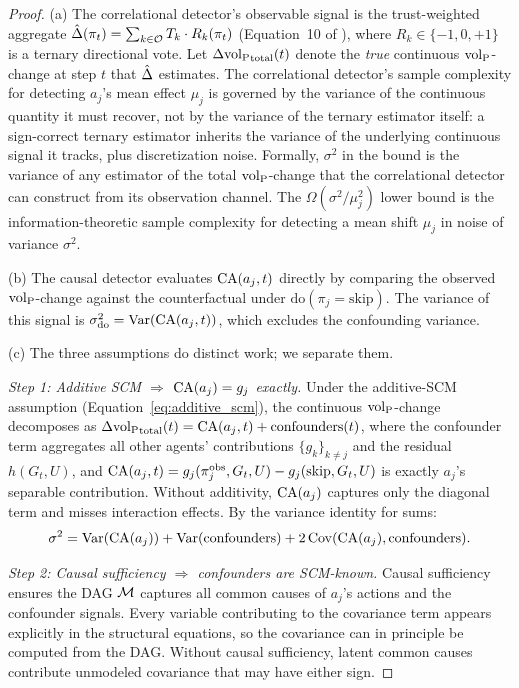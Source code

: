 \begin{proof}
(a) The correlational detector's observable signal is the
trust-weighted aggregate
$\hat{\Delta}(\pi_t) = \sum_{k \in \mathcal{O}} T_k \cdot R_k(\pi_t)$
(Equation~10 of \citet{lasser2026gfm}), where $R_k \in \{-1, 0, +1\}$
is a ternary directional vote. Let
$\Delta {\operatorname{vol}_{\mathrm{P}}}_{\mathrm{total}}(t)$ denote the \emph{true} continuous
${\operatorname{vol}_{\mathrm{P}}}$-change at step $t$ that $\hat{\Delta}$ estimates. The
correlational detector's sample complexity for detecting $a_j$'s
mean effect $\mu_j$ is governed by the variance of the continuous
quantity it must recover, not by the variance of the ternary
estimator itself: a sign-correct ternary estimator inherits the
variance of the underlying continuous signal it tracks, plus
discretization noise. Formally, $\sigma^2$ in the bound is the
variance of any estimator of the total ${\operatorname{vol}_{\mathrm{P}}}$-change that the
correlational detector can construct from its observation channel.
The $\Omega(\sigma^2 / \mu_j^2)$ lower bound is the
information-theoretic sample complexity for detecting a mean shift
$\mu_j$ in noise of variance $\sigma^2$.

(b) The causal detector evaluates $\mathrm{CA}(a_j, t)$ directly by
comparing the observed ${\operatorname{vol}_{\mathrm{P}}}$-change against the counterfactual under
$\mathrm{do}(\pi_j = \mathrm{skip})$. The variance of this signal is
$\sigma_{\mathrm{do}}^2 = \mathrm{Var}(\mathrm{CA}(a_j, t))$, which
excludes the confounding variance.

(c) The three assumptions do distinct work; we separate them.

\emph{Step 1: Additive SCM $\Rightarrow$ $\mathrm{CA}(a_j) = g_j$
exactly.} Under the additive-SCM assumption
(Equation~\eqref{eq:additive_scm}), the continuous ${\operatorname{vol}_{\mathrm{P}}}$-change
decomposes as
$\Delta {\operatorname{vol}_{\mathrm{P}}}_{\mathrm{total}}(t) = \mathrm{CA}(a_j, t) +
    \mathrm{confounders}(t)$,
where the confounder term aggregates all other agents' contributions
$\{g_k\}_{k \neq j}$ and the residual $h(G_t, U)$, and
$\mathrm{CA}(a_j, t) = g_j(\pi_j^{\mathrm{obs}}, G_t, U) -
g_j(\mathrm{skip}, G_t, U)$ is exactly $a_j$'s separable
contribution. Without additivity, $\mathrm{CA}(a_j)$ captures only
the diagonal term and misses interaction effects. By the variance
identity for sums:
\[
\sigma^2 = \mathrm{Var}(\mathrm{CA}(a_j))
    + \mathrm{Var}(\mathrm{confounders})
    + 2\,\mathrm{Cov}(\mathrm{CA}(a_j), \mathrm{confounders}).
\]

\emph{Step 2: Causal sufficiency $\Rightarrow$ confounders are
SCM-known.} Causal sufficiency ensures the DAG $\mathcal{M}$ captures all
common causes of $a_j$'s actions and the confounder signals. Every
variable contributing to the covariance term appears explicitly in
the structural equations, so the covariance can in principle be
computed from the DAG. Without causal sufficiency, latent common
causes contribute unmodeled covariance that may have either sign.


\end{proof}
